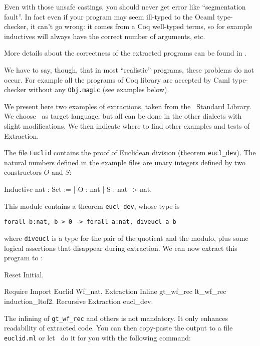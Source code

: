 Even with those unsafe castings, you should never get error like
``segmentation fault''. In fact even if your program may seem
ill-typed to the Ocaml type-checker, it can't go wrong: it comes 
from a Coq well-typed terms, so for example inductives will always 
have the correct number of arguments, etc. 

More details about the correctness of the extracted programs can be 
found in \cite{Let02}.

We have to say, though, that in most ``realistic'' programs, these
problems do not occur. For example all the programs of Coq library are
accepted by Caml type-checker without any {\tt Obj.magic} (see examples below).




We present here two examples of extractions, taken from the 
\Coq\ Standard Library. We choose \ocaml\ as target language, 
but all can be done in the other dialects with slight modifications.
We then indicate where to find other examples and tests of Extraction.


The file {\tt Euclid} contains the proof of Euclidean division
(theorem {\tt eucl\_dev}). The natural numbers defined in the example
files are unary integers defined by two constructors $O$ and $S$:
\begin{coq_example*}
Inductive nat : Set :=
  | O : nat
  | S : nat -> nat.
\end{coq_example*}

This module contains a theorem {\tt eucl\_dev}, whose type is
\begin{verbatim}
forall b:nat, b > 0 -> forall a:nat, diveucl a b
\end{verbatim}
where {\tt diveucl} is a type for the pair of the quotient and the
modulo, plus some logical assertions that disappear during extraction.
We can now extract this program to \ocaml:

\begin{coq_eval}
Reset Initial.
\end{coq_eval}
\begin{coq_example}
Require Import Euclid Wf_nat.
Extraction Inline gt_wf_rec lt_wf_rec induction_ltof2.
Recursive Extraction eucl_dev.
\end{coq_example}

The inlining of {\tt gt\_wf\_rec} and others is not
mandatory. It only enhances readability of extracted code.
You can then copy-paste the output to a file {\tt euclid.ml} or let 
\Coq\ do it for you with the following command: 

